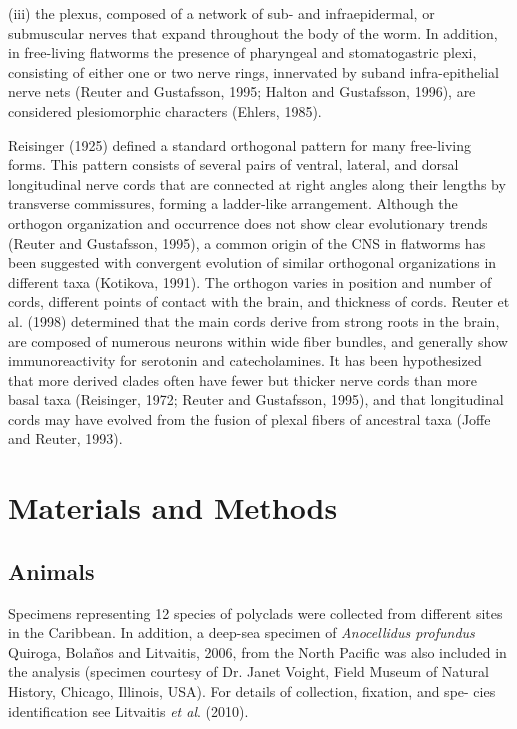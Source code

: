 \begin{multicols}{2}
(iii) the plexus, composed of a network of sub- and infraepidermal, or submuscular nerves that expand throughout
the body of the worm. In addition, in free-living flatworms
the presence of pharyngeal and stomatogastric plexi, consisting of either one or two nerve rings, innervated by suband infra-epithelial nerve nets (Reuter and Gustafsson,
1995; Halton and Gustafsson, 1996), are considered plesiomorphic characters (Ehlers, 1985).
\par{}Reisinger (1925) defined a standard orthogonal pattern for many free-living forms. This pattern consists of
several pairs of ventral, lateral, and dorsal longitudinal
nerve cords that are connected at right angles along their
lengths by transverse commissures, forming a ladder-like
arrangement. Although the orthogon organization and occurrence does not show clear evolutionary trends (Reuter
and Gustafsson, 1995), a common origin of the CNS in
flatworms has been suggested with convergent evolution of
similar orthogonal organizations in different taxa (Kotikova, 1991). The orthogon varies in position and number of
cords, different points of contact with the brain, and thickness of cords. Reuter et al. (1998) determined that the main
cords derive from strong roots in the brain, are composed of
numerous neurons within wide fiber bundles, and generally
show immunoreactivity for serotonin and catecholamines.
It has been hypothesized that more derived clades often
have fewer but thicker nerve cords than more basal taxa
(Reisinger, 1972; Reuter and Gustafsson, 1995), and that
longitudinal cords may have evolved from the fusion of
plexal fibers of ancestral taxa (Joffe and Reuter, 1993).

\lipsum

\section*{Materials and Methods}

\subsection*{Animals}

\par{}Specimens representing 12 species of polyclads were
collected from different sites in the Caribbean. In addition,
a deep-sea specimen of \textit{Anocellidus profundus} Quiroga,
Bolaños and Litvaitis, 2006, from the North Pacific was
also included in the analysis (specimen courtesy of Dr.
Janet Voight, Field Museum of Natural History, Chicago,
Illinois, USA). For details of collection, fixation, and spe-
cies identification see Litvaitis \textit{et al}. (2010).


\end{multicols}
